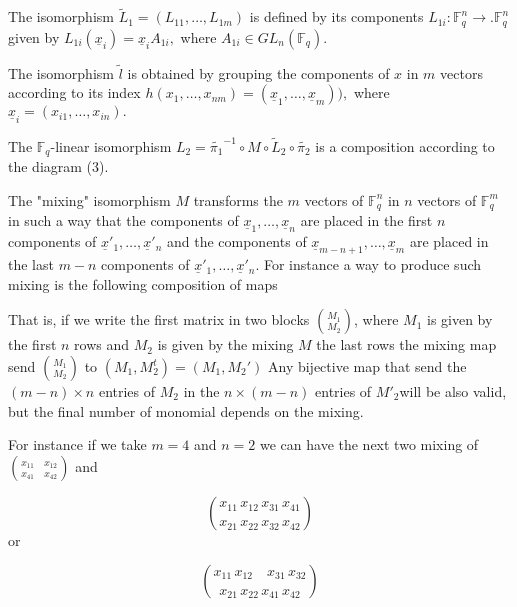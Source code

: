 \documentclass[12pt,a4paper]{amsart}
\theoremstyle{remark}
\theoremstyle{definition}
\newcommand\gfq{\mathbb{F}_q}
\begin{document}
The isomorphism $\tilde{L}_1=(L_{11},\ldots,L_{1m})$  is defined by its components $L_{1i}:\mathbb{F}_{q}^n\to .\mathbb{F}_{q}^n$
given by $L_{1i}(\underline{x}_i)=\underline{x}_i A_{1i},$ where $A_{1i}\in GL_n (\mathbb{F}_{q}).$



The isomorphism  $\tilde{ l}$ is obtained by grouping the components of $x$ in $m$ vectors 
according to its index $h(x_1,\ldots,x_{nm})= (\underline{x}_1,\ldots,\underline{x}_m )),$ where 
$\underline{x}_i=(x_{i1},\ldots, x_{in}).$






The $\gfq$-linear  isomorphism $L_2=\tilde{\pi_1}^{-1}\circ M \circ \tilde{ L}_2\circ \tilde{\pi_2} $ is a composition according to the 
diagram (3).
\begin{center}

\end{center}
The "mixing"  isomorphism $M$ transforms the $m$ vectors of $\gfq^n$ in $n$ vectors of $\gfq^m$  in such a way that 
the components of $\underline{x}_1,\ldots,\underline{x}_n$ are  placed  in the first $n$ components of 
$\underline{x}'_1,\ldots, \underline{x}'_n$ and
the components of $\underline{x}_{m-n+1},\ldots,\underline{x}_m$ are placed in the last $m-n$ components of  
$\underline{x}'_1,\ldots, \underline{x}'_n$.
For instance a way to produce such mixing is the following
composition of maps 
\begin{center}

\end{center}
That is, if we write
the first matrix in two blocks  $\binom{M_1}{M_2} $, where  $M_1$ is given by the first $n$ rows and $M_2$ is given by the mixing $M$ 
the last rows  the mixing map send  $\binom{M_1}{M_2} $ to $(M_1, M_2^t)=(M_1,M_2')$
Any bijective map that send the $(m-n)\times n$ entries of $M_2$ in the $n\times (m-n)$ entries of $M'_2$will be also valid, 
but the final number of monomial depends on the mixing.



For instance if we take  $m=4$ and $n=2$  we can have the next two mixing of    
$\binom{ x_{11} \quad x_{12}}{x_{41} \quad x_{42} }$ and




\begin{equation}
\binom{ x_{11} \, x_{12} \,   x_{31} \, x_{41}}{x_{21} \, x_{22} \,   x_{32} \, x_{42}   }   
\end{equation}
or

\begin{equation}
  \binom{ x_{11} \, x_{12} \quad   x_{31} \, x_{32}}{x_{21} \, x_{22} \,   x_{41} \, x_{42}   }   
\end{equation}
\end{document}
